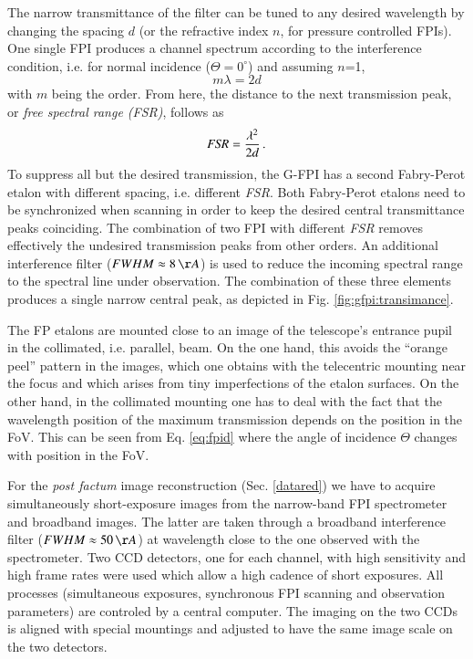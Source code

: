The narrow transmittance of the filter can be tuned to any desired wavelength by changing the spacing $d$ (or the refractive index $n$, for pressure controlled FPIs). 
One single FPI produces a channel spectrum according to the interference condition, i.e. for normal incidence ($\Theta = 0^{\circ}$) and assuming $n$=1,
\begin{equation}
m\lambda = 2 d
\end{equation}
with $m$ being the order. From here, the distance to the next transmission peak, or \emph{free spectral range (FSR)}, follows as
\begin{equation}
\emph{FSR}=\frac{\lambda^{2}}{2d} \, .
\end{equation}
To suppress all but the desired transmission, the G-FPI has a second Fabry-Perot etalon with different spacing, i.e. different \emph{FSR}. Both Fabry-Perot etalons need to be synchronized when scanning in order to keep the desired central transmittance peaks coinciding. The combination of two FPI with different \emph{FSR} removes effectively the undesired  transmission peaks from other orders. An additional interference filter  ($FWHM \approx 8\, \AA %
$) is used to reduce the incoming spectral range to the spectral line under observation. The combination of these three  elements produces a single narrow central peak, as depicted in Fig. \ref{fig:gfpi:transimance}. 

The FP etalons are mounted close to an image of the telescope's entrance pupil in the collimated, i.e. parallel, beam. On the one hand, this avoids the ``orange peel'' pattern in the images, which one obtains with the telecentric mounting near the focus and which arises from tiny imperfections of the etalon surfaces. On the other hand, in the collimated mounting one has to deal with the fact that the wavelength position of the maximum transmission depends on the position in the FoV. This can be seen from Eq. \ref{eq:fpid} where the angle of incidence $\Theta$ changes with position in the FoV.



For the {\em post factum} image reconstruction (Sec. \ref{datared}) we have to acquire simultaneously short-exposure images from the narrow-band FPI spectrometer and broadband images. The latter are taken through a broadband interference filter ($FWHM \approx 50\, \AA $) at wavelength close to the one observed with the spectrometer. Two CCD detectors, one for each channel, with high sensitivity and high frame rates were used which allow a high cadence of short exposures. All processes (simultaneous exposures, synchronous FPI scanning and observation parameters) are controled by a central computer. The imaging on the two CCDs is aligned with special mountings and adjusted to have the same image scale on the two detectors.


